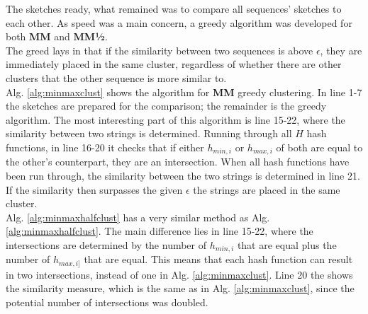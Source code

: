 \documentclass[../../main.tex]{subfiles}
\begin{document}
The sketches ready, what remained was to compare all sequences' sketches to each other. As speed was a main concern, a greedy algorithm was developed for both {\bf MM} and {\bf MM½}.\\

The greed lays in that if the similarity between two sequences is above $\epsilon$, they are immediately placed in the same cluster, regardless of whether there are other clusters that the other sequence is more similar to. \\

Alg. \ref{alg:minmaxclust} shows the algorithm for {\bf MM} greedy clustering. In line 1-7 the sketches are prepared for the comparison; the remainder is the greedy algorithm. The most interesting part of this algorithm is line 15-22, where the similarity between two strings is determined. Running through all $H$ hash functions, in line 16-20 it checks that if either $h_{min,i}$ or $h_{max,i}$ of both are equal to the other's counterpart, they are an intersection. When all hash functions have been run through, the similarity between the two strings is determined in line 21. If the similarity then surpasses the given $\epsilon$ the strings are placed in the same cluster.\\

Alg. \ref{alg:minmaxhalfclust} has a very similar method as Alg. \ref{alg:minmaxhalfclust}. The main difference lies in line 15-22, where the intersections are determined by the number of $h_{min,i}$ that are equal plus the number of $h_{max,i]}$ that are equal. This means that each hash function can result in two intersections, instead of one in Alg. \ref{alg:minmaxclust}. Line 20 the shows the similarity measure, which is the same as in Alg. \ref{alg:minmaxclust}, since the potential number of intersections was doubled.
\end{document}
